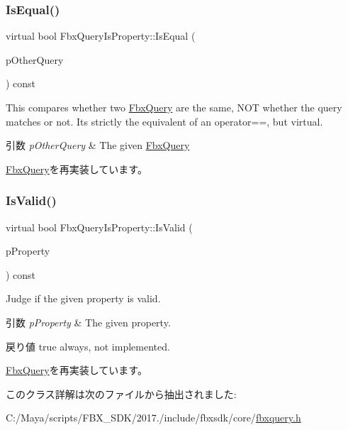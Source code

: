 \subsubsection{\texorpdfstring{Is\+Equal()}{IsEqual()}}
{\footnotesize\ttfamily virtual bool Fbx\+Query\+Is\+Property\+::\+Is\+Equal (\begin{DoxyParamCaption}\item[{\hyperlink{class_fbx_query}{Fbx\+Query} $\ast$}]{p\+Other\+Query }\end{DoxyParamCaption}) const\hspace{0.3cm}{\ttfamily [virtual]}}

This compares whether two \hyperlink{class_fbx_query}{Fbx\+Query} are the same, N\+OT whether the query matches or not. It\textquotesingle{}s strictly the equivalent of an operator==, but virtual. 
\begin{DoxyParams}{引数}
{\em p\+Other\+Query} & The given \hyperlink{class_fbx_query}{Fbx\+Query} \\
\hline
\end{DoxyParams}


\hyperlink{class_fbx_query_adfc24c7306ceed2fcfd8c67198e0c1dd}{Fbx\+Query}を再実装しています。

\mbox{\label{class_fbx_query_is_property_a6f9680d513428cba6321203c9b3da71e}} 
\subsubsection{\texorpdfstring{Is\+Valid()}{IsValid()}}
{\footnotesize\ttfamily virtual bool Fbx\+Query\+Is\+Property\+::\+Is\+Valid (\begin{DoxyParamCaption}\item[{const \hyperlink{class_fbx_property}{Fbx\+Property} \&}]{p\+Property }\end{DoxyParamCaption}) const\hspace{0.3cm}{\ttfamily [virtual]}}

Judge if the given property is valid. 
\begin{DoxyParams}{引数}
{\em p\+Property} & The given property. \\
\hline
\end{DoxyParams}
\begin{DoxyReturn}{戻り値}
{\ttfamily true} always, not implemented. 
\end{DoxyReturn}


\hyperlink{class_fbx_query_a822776baf45a56d8e126e948ec25d920}{Fbx\+Query}を再実装しています。



このクラス詳解は次のファイルから抽出されました\+:\begin{DoxyCompactItemize}
\item 
C\+:/\+Maya/scripts/\+F\+B\+X\+\_\+\+S\+D\+K/2017./include/fbxsdk/core/\hyperlink{fbxquery_8h}{fbxquery.\+h}\end{DoxyCompactItemize}
